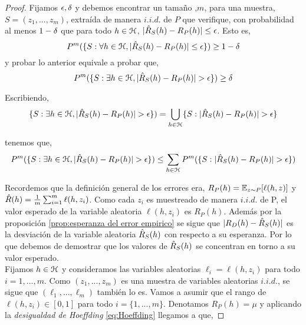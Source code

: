     \begin{proof}
    
    Fijamos $\epsilon,\delta$ y debemos encontrar un tamaño ,$m$, para una muestra, $S = (z_1,...,z_m)$, extraída de manera $i.i.d.$ de $P$ que verifique, con probabilidad al menos $1-\delta$ que para todo $h \in \mathcal{H}$, $|\hat{R}_S(h) - R_{P}(h) | \leq \epsilon$. Esto es,
        \begin{equation}
            P^m(\{ S: \forall h \in \mathcal{H}, | \hat{R}_S(h) - R_P(h) | \leq  \epsilon \}) \geq 1 - \delta
        \end{equation}
    \noindent y probar lo anterior equivale a probar que,
        \begin{equation}
            P^m(\{ S: \exists h \in \mathcal{H}, |\hat{R}_S(h) - R_P(h) | >  \epsilon \}) \geq \delta
        \end{equation}
    
    \noindent Escribiendo, 
        \begin{equation}
           \{ S: \exists h \in \mathcal{H}, |\hat{R}_S(h) - R_P(h) | >  \epsilon \}) = \bigcup_{h\in\mathcal{H}} \{S: |\hat{R}_S(h) - R_P(h) | >  \epsilon\}
        \end{equation}
        
    \noindent tenemos que,
        \begin{equation}\label{eq:aux01}
            P^m(\{ S: \exists h \in \mathcal{H}, |\hat{R}_S(h) - R_P(h) | >  \epsilon \}) \leq \sum_{h \in \mathcal{H}} P^m(\{S: |\hat{R}_S(h) - R_P(h) | >  \epsilon\})
        \end{equation}
    
    Recordemos que la definición general de los errores era, $R_P(h) = \mathbb{E}_{z\sim P}[\ell(h,z)]$ y $\hat{R}(h) = \frac{1}{m} \sum_{i=1}^m \ell(h,z_i)$. Como cada $z_i$ es muestreado de manera $i.i.d.$ de P, el valor esperado de la variable aleatoria $\ell(h,z_i)$ es $R_P(h)$. Además por la proposición \ref{prop:esperanza del error empirico} se sigue que $|R_{D}(h) - \hat{R}_S(h)|$ es la desviación de la variable aleatoria $\hat{R}_S(h)$ con respecto a su esperanza. Por lo que debemos de demostrar que los valores de $\hat{R}_S(h)$ se concentran en torno a su valor esperado. \\
    
    Fijamos $h \in \mathcal{H}$ y consideramos las variables aleatorias $\ell_i = \ell(h,z_i)$ para todo $i=1,...,m$. Como $(z_1,...,z_m)$ es una muestra de variables aleatorias $i.i.d.$, se sigue que $(\ell_1,...,\ell_m)$ también lo es. Vamos a asumir que el rango de $\ell(h,z_i) \in [0,1]$ para todo $i=\{1,...,m\}$. Denotamos $R_P(h) = \mu$ y aplicando la \textit{desigualdad de Hoeffding} \eqref{eq:Hoeffding} llegamos a que,
    

\end{proof}
